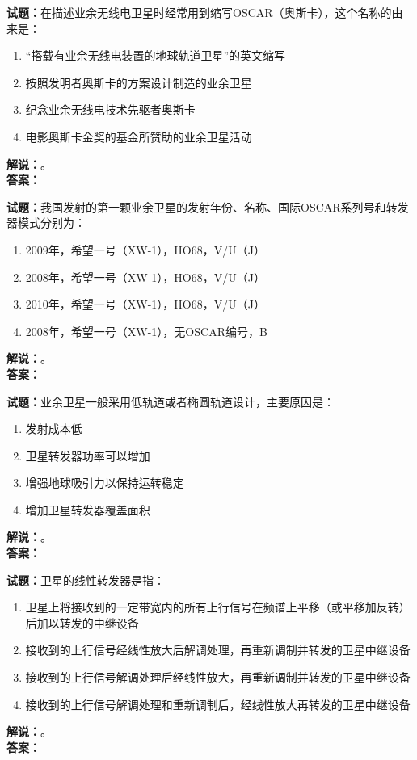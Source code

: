 \documentclass{ctexbook}
\begin{document}
\bigskip




\noindent\textbf{试题：}在描述业余无线电卫星时经常用到缩写OSCAR（奥斯卡），这个名称的由来是：
\begin{enumerate}[leftmargin=3em]
\item “搭载有业余无线电装置的地球轨道卫星”的英文缩写
\item 按照发明者奥斯卡的方案设计制造的业余卫星
\item 纪念业余无线电技术先驱者奥斯卡
\item 电影奥斯卡金奖的基金所赞助的业余卫星活动
\end{enumerate}
\noindent\textbf{解说：}\textbf{}。\\\noindent\textbf{答案：}

\bigskip




\noindent\textbf{试题：}我国发射的第一颗业余卫星的发射年份、名称、国际OSCAR系列号和转发器模式分别为：
\begin{enumerate}[leftmargin=3em]
\item 2009年，希望一号（XW-1），HO68，V/U（J）
\item 2008年，希望一号（XW-1），HO68，V/U（J）
\item 2010年，希望一号（XW-1），HO68，V/U（J）
\item 2008年，希望一号（XW-1），无OSCAR编号，B
\end{enumerate}
\noindent\textbf{解说：}\textbf{}。\\\noindent\textbf{答案：}

\bigskip




\noindent\textbf{试题：}业余卫星一般采用低轨道或者椭圆轨道设计，主要原因是：
\begin{enumerate}[leftmargin=3em]
\item 发射成本低
\item 卫星转发器功率可以增加
\item 增强地球吸引力以保持运转稳定
\item 增加卫星转发器覆盖面积
\end{enumerate}
\noindent\textbf{解说：}\textbf{}。\\\noindent\textbf{答案：}

\bigskip




\noindent\textbf{试题：}卫星的线性转发器是指：
\begin{enumerate}[leftmargin=3em]
\item 卫星上将接收到的一定带宽内的所有上行信号在频谱上平移（或平移加反转）后加以转发的中继设备
\item 接收到的上行信号经线性放大后解调处理，再重新调制并转发的卫星中继设备
\item 接收到的上行信号解调处理后经线性放大，再重新调制并转发的卫星中继设备
\item 接收到的上行信号解调处理和重新调制后，经线性放大再转发的卫星中继设备
\end{enumerate}
\noindent\textbf{解说：}\textbf{}。\\\noindent\textbf{答案：}
\end{document}

